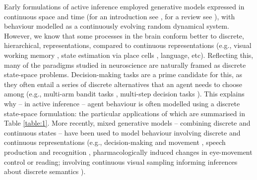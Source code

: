 \documentclass{article}
\begin{document}
Early formulations of active inference employed generative models expressed in continuous space and time (for an introduction see \cite{bogaczTutorialFreeenergyFramework2017}, for a review see \cite{buckleyFreeEnergyPrinciple2017}), with behaviour modelled as a continuously evolving random dynamical system. However, we know that some processes in the brain conform better to discrete, hierarchical, representations, compared to continuous representations (e.g., visual working memory \cite{luckCapacityVisualWorking1997, zhangDiscreteFixedResolutionRepresentations2008}, state estimation via place cells \cite{eichenbaumHippocampusMemoryPlace1999, okeefeHippocampusSpatialMap1971}, language, etc). Reflecting this, many of the paradigms studied in neuroscience are naturally framed as discrete state-space problems. Decision-making tasks are a prime candidate for this, as they often entail a series of discrete alternatives that an agent needs to choose among (e.g., multi-arm bandit tasks \cite{dawCorticalSubstratesExploratory2006, reverdyModelingHumanDecisionmaking2013, wuGeneralizationGuideshuman2018}, multi-step decision tasks \cite{dawModelBasedInfluencesHumans2011}). This explains why – in active inference – agent behaviour is often modelled using a discrete state-space formulation: the particular applications of which are summarised in Table \ref{table:1}. More recently, mixed generative models \cite{fristonGraphicalBrainBelief2017} – combining discrete and continuous states – have been used to model behaviour involving discrete and continuous representations (e.g., decision-making and movement \cite{parrDiscreteContinuousBrain2018}, speech production and recognition \cite{fristonActiveListening2020}, pharmacologically induced changes in eye-movement control \cite{parrComputationalPharmacologyOculomotion2019} or reading; involving continuous visual sampling informing inferences about discrete semantics \cite{fristonGraphicalBrainBelief2017}).
\end{document}
